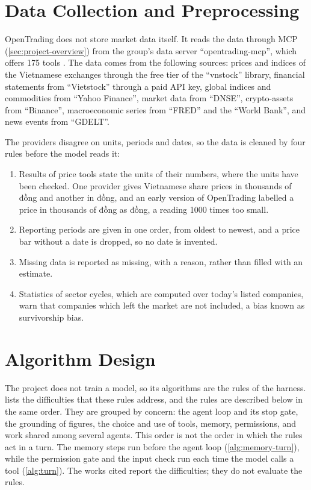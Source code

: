 \section{Data Collection and Preprocessing}\label{sec:data}
OpenTrading does not store market data itself.
It reads the data through MCP (\cref{sec:project-overview}) from the group's data server \enquote{opentrading-mcp}, which offers \num{175} tools \parencite{group2026opentradingmcp}.
The data comes from the following sources: prices and indices of the Vietnamese exchanges through the free tier of the \enquote{vnstock} library, financial statements from \enquote{Vietstock} through a paid API key, global indices and commodities from \enquote{Yahoo Finance}, market data from \enquote{DNSE}, crypto-assets from \enquote{Binance}, macroeconomic series from \enquote{FRED} and the \enquote{World Bank}, and news events from \enquote{GDELT}.

The providers disagree on units, periods and dates, so the data is cleaned by four rules before the model reads it:
\begin{enumerate}
  \item Results of price tools state the units of their numbers, where the units have been checked.
  One provider gives Vietnamese share prices in thousands of đồng and another in đồng, and an early version of OpenTrading labelled a price in thousands of đồng as đồng, a reading \num{1000} times too small.
  \item Reporting periods are given in one order, from oldest to newest, and a price bar without a date is dropped, so no date is invented.
  \item Missing data is reported as missing, with a reason, rather than filled with an estimate.
  \item Statistics of sector cycles, which are computed over today's listed companies, warn that companies which left the market are not included, a bias known as survivorship bias.
\end{enumerate}

\section{Algorithm Design}\label{sec:algorithm}
The project does not train a model, so its algorithms are the rules of the harness.
 lists the difficulties that these rules address, and the rules are described below in the same order.
They are grouped by concern: the agent loop and its stop gate, the grounding of figures, the choice and use of tools, memory, permissions, and work shared among several agents.
This order is not the order in which the rules act in a turn.
The memory steps run before the agent loop (\cref{alg:memory-turn}), while the permission gate and the input check run each time the model calls a tool (\cref{alg:turn}).
The works cited report the difficulties; they do not evaluate the rules.

